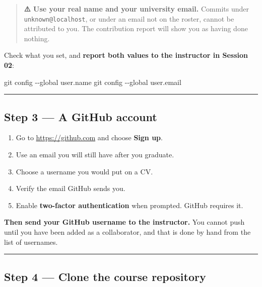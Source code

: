 \documentclass[
  letterpaper,
  10pt,
  twoside,
  openright,
  numbers=noenddot,
  chapterprefix=true]{scrbook}
\newenvironment{Shaded}{}{}
\newcommand{\AttributeTok}[1]{\textcolor[rgb]{0.84,0.23,0.29}{#1}}
\newcommand{\FunctionTok}[1]{\textcolor[rgb]{0.44,0.26,0.76}{#1}}
\newcommand{\NormalTok}[1]{\textcolor[rgb]{0.14,0.16,0.18}{#1}}
\providecommand{\tightlist}{%
  \setlength{\itemsep}{0pt}\setlength{\parskip}{0pt}}
\begin{document}
\begin{quote}
\textbf{⚠️ Use your real name and your university email.} Commits under
\texttt{unknown@localhost}, or under an email not on the roster, cannot
be attributed to you. The contribution report will show you as having
done nothing.
\end{quote}

Check what you set, and \textbf{report both values to the instructor in
Session 02}:

\begin{Shaded}
\begin{Highlighting}[]
\FunctionTok{git}\NormalTok{ config }\AttributeTok{{-}{-}global}\NormalTok{ user.name}
\FunctionTok{git}\NormalTok{ config }\AttributeTok{{-}{-}global}\NormalTok{ user.email}
\end{Highlighting}
\end{Shaded}

\begin{center}\rule{0.5\linewidth}{0.5pt}\end{center}

\subsection{Step 3 --- A GitHub account}\label{step-3-a-github-account}

\begin{enumerate}
\def\labelenumi{\arabic{enumi}.}
\tightlist
\item
  Go to \url{https://github.com} and choose \textbf{Sign up}.
\item
  Use an email you will still have after you graduate.
\item
  Choose a username you would put on a CV.
\item
  Verify the email GitHub sends you.
\item
  Enable \textbf{two-factor authentication} when prompted. GitHub
  requires it.
\end{enumerate}

\textbf{Then send your GitHub username to the instructor.} You cannot
push until you have been added as a collaborator, and that is done by
hand from the list of usernames.

\begin{center}\rule{0.5\linewidth}{0.5pt}\end{center}

\subsection{Step 4 --- Clone the course
repository}\label{step-4-clone-the-course-repository}
\end{document}
